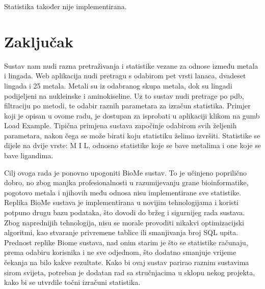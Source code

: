 \documentclass[times, utf8, zavrsni]{fer}
\begin{document}
Statistika također nije implementirana.

\chapter{Zaključak}
Sustav nam nudi razna pretraživanja i statistike vezane za odnose između metala i lingada.
Web aplikacija nudi pretragu s odabirom pet vrsti lanaca, dvadeset lingada i 25 metala.
Metali su iz odabranog skupa metala, dok su lingadi  podijeljeni na nukleinske i aminokiseline.
Uz to sustav nudi pretrage po pdb, filtraciju po metodi, te odabir raznih parametara za izračun statistika.
Primjer koji je opisan u ovome radu, je dostupan za isprobati u aplikaciji klikom na gumb Load Example.
Tipična primjena sustava započinje odabirom svih željenih parametara, nakon čega se može birati
koju statistiku želimo izvršiti. Statistike se dijele na dvije vrste: M I L, odnosno statistike koje se bave metalima i one koje se bave ligandima.

Cilj ovoga rada je ponovno upogoniti BioMe sustav. To je učinjeno poprilično dobro, no zbog manjka profesionalnosti u razumijevanju grane bioinformatike, pogotovo metala i njihovih među odnosa nisu implementirane sve statistike.
Replika BioMe sustava je implementirana u novijim tehnologijama i koristi potpuno drugu bazu podataka, što dovodi do bržeg i sigurnijeg rada sustava. Zbog naprednijih tehnologija, nisu se morale provoditi nikakvi optimizacijski algoritmi, kao
stvaranje privremene tablice ili smanjivanja broj SQL upita. Prednost replike Biome sustava, nad onim starim je što se statistike računaju, prema odabiru korisnika i ne sve odjednom, što dodatno smanjuje vrijeme čekanja na bilo kakve rezultate.
Kako bi ovaj sustav parirao raznim sustavima sirom svijeta, potreban je dodatan rad sa stručnjacima u sklopu nekog projekta, kako bi se utvrdile točni izračuni statistika.




\end{document}
